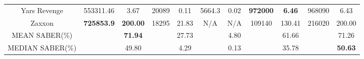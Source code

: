 \documentclass[nohyperref]{article}
\def\GDIHmeanSABER{71.26}
\def\GDIHmedianSABER{50.63}
\def\GDIImeanSABER{61.66}
\def\GDIImedianSABER{35.78}
\def\muzeromeanSABER{71.94}
\def\muzeromedianSABER{49.80}
\def\dreamermeanSABER{27.73}
\def\dreamermedianSABER{4.29}
\def\simplemeanSABER{4.80}
\def\simplemedianSABER{0.13}
\newcommand{\best}[1]{\textbf{#1}}
\theoremstyle{plain}
\begin{document}
\begin{table}[!hb]
\begin{center}
\begin{tabular}{|c |c c| c c| c c| c c| c c| }
 Yars Revenge       & 553311.46               & 3.67      & 20089             &0.11     & 5664.3            & 0.02    & \best{972000}        & \best{6.46}      &968090          &6.43\\
 Zaxxon             & \textbf{725853.9}       & \textbf{200.00}      & 18295    &21.83          & N/A      & N/A     & 109140      & 130.41                     &216020          &200.00\\
\hline
MEAN SABER(\%) &               &\textbf{\muzeromeanSABER}  &         &  \dreamermeanSABER &                                          & \simplemeanSABER  &     & \GDIImeanSABER &      &\GDIHmeanSABER\\
\hline
MEDIAN SABER(\%) &            &\muzeromedianSABER   &         & \dreamermedianSABER  &                                          & \simplemedianSABER  &     & \GDIImedianSABER &      & \textbf{\GDIHmedianSABER}  \\
\hline
\end{tabular}
\end{center}
\end{table}
\clearpage
\end{document}

